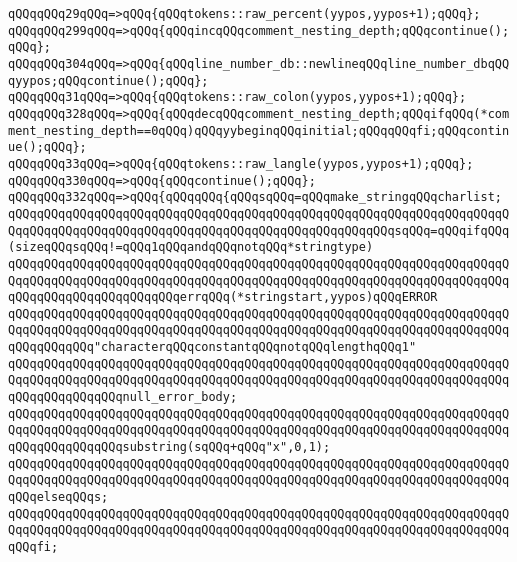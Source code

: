 \verb|qQQqqQQq29qQQq=>qQQq{qQQqtokens::raw_percent(yypos,yypos+1);qQQq};|\newline
\verb|qQQqqQQq299qQQq=>qQQq{qQQqincqQQqcomment_nesting_depth;qQQqcontinue();qQQq};|\newline
\verb|qQQqqQQq304qQQq=>qQQq{qQQqline_number_db::newlineqQQqline_number_dbqQQqyypos;qQQqcontinue();qQQq};|\newline
\verb|qQQqqQQq31qQQq=>qQQq{qQQqtokens::raw_colon(yypos,yypos+1);qQQq};|\newline
\verb|qQQqqQQq328qQQq=>qQQq{qQQqdecqQQqcomment_nesting_depth;qQQqifqQQq(*comment_nesting_depth==0qQQq)qQQqyybeginqQQqinitial;qQQqqQQqfi;qQQqcontinue();qQQq};|\newline
\verb|qQQqqQQq33qQQq=>qQQq{qQQqtokens::raw_langle(yypos,yypos+1);qQQq};|\newline
\verb|qQQqqQQq330qQQq=>qQQq{qQQqcontinue();qQQq};|\newline
\verb|qQQqqQQq332qQQq=>qQQq{qQQqqQQq{qQQqsqQQq=qQQqmake_stringqQQqcharlist;|\newline
\verb|qQQqqQQqqQQqqQQqqQQqqQQqqQQqqQQqqQQqqQQqqQQqqQQqqQQqqQQqqQQqqQQqqQQqqQQqqQQqqQQqqQQqqQQqqQQqqQQqqQQqqQQqqQQqqQQqqQQqqQQqqQQqsqQQq=qQQqifqQQq(sizeqQQqsqQQq!=qQQq1qQQqandqQQqnotqQQq*stringtype)|\newline
\verb|qQQqqQQqqQQqqQQqqQQqqQQqqQQqqQQqqQQqqQQqqQQqqQQqqQQqqQQqqQQqqQQqqQQqqQQqqQQqqQQqqQQqqQQqqQQqqQQqqQQqqQQqqQQqqQQqqQQqqQQqqQQqqQQqqQQqqQQqqQQqqQQqqQQqqQQqqQQqqQQqqQQqerrqQQq(*stringstart,yypos)qQQqERROR|\newline
\verb|qQQqqQQqqQQqqQQqqQQqqQQqqQQqqQQqqQQqqQQqqQQqqQQqqQQqqQQqqQQqqQQqqQQqqQQqqQQqqQQqqQQqqQQqqQQqqQQqqQQqqQQqqQQqqQQqqQQqqQQqqQQqqQQqqQQqqQQqqQQqqQQqqQQqqQQq"characterqQQqconstantqQQqnotqQQqlengthqQQq1"|\newline
\verb|qQQqqQQqqQQqqQQqqQQqqQQqqQQqqQQqqQQqqQQqqQQqqQQqqQQqqQQqqQQqqQQqqQQqqQQqqQQqqQQqqQQqqQQqqQQqqQQqqQQqqQQqqQQqqQQqqQQqqQQqqQQqqQQqqQQqqQQqqQQqqQQqqQQqqQQqqQQqnull_error_body;|\newline
\verb|qQQqqQQqqQQqqQQqqQQqqQQqqQQqqQQqqQQqqQQqqQQqqQQqqQQqqQQqqQQqqQQqqQQqqQQqqQQqqQQqqQQqqQQqqQQqqQQqqQQqqQQqqQQqqQQqqQQqqQQqqQQqqQQqqQQqqQQqqQQqqQQqqQQqqQQqqQQqsubstring(sqQQq+qQQq"x",0,1);|\newline
\verb|qQQqqQQqqQQqqQQqqQQqqQQqqQQqqQQqqQQqqQQqqQQqqQQqqQQqqQQqqQQqqQQqqQQqqQQqqQQqqQQqqQQqqQQqqQQqqQQqqQQqqQQqqQQqqQQqqQQqqQQqqQQqqQQqqQQqqQQqqQQqqQQqelseqQQqs;|\newline
\verb|qQQqqQQqqQQqqQQqqQQqqQQqqQQqqQQqqQQqqQQqqQQqqQQqqQQqqQQqqQQqqQQqqQQqqQQqqQQqqQQqqQQqqQQqqQQqqQQqqQQqqQQqqQQqqQQqqQQqqQQqqQQqqQQqqQQqqQQqqQQqqQQqfi;|\newline
